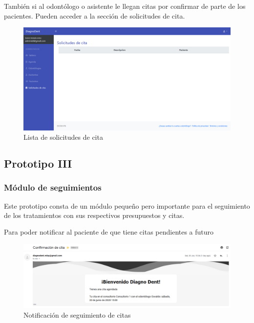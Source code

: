 También si al odontólogo o asistente le llegan citas por confirmar de parte de los pacientes. Pueden acceder a la sección de solicitudes de cita.

\begin{figure}[H]
\centering
\includegraphics[width=17cm,keepaspectratio]{pictures/adminodo/citas/solicitudes-cita-1.png}
\caption{Lista de solicitudes de cita }
\end{figure}










\subsection{Prototipo III}
\subsubsection{Módulo de seguimientos}

Este prototipo consta de un módulo pequeño pero importante para el seguimiento de los tratamientos con sus respectivos presupuestos y citas.

\vspace{1em}

Para poder notificar al paciente de que tiene citas pendientes a futuro 

\begin{figure}[H]
\centering
\includegraphics[width=17cm,keepaspectratio]{pictures/adminodo/pacientes/seguimiento/confirmacion-cita1.PNG}
\caption{Notificación de seguimiento de citas}
\end{figure}






